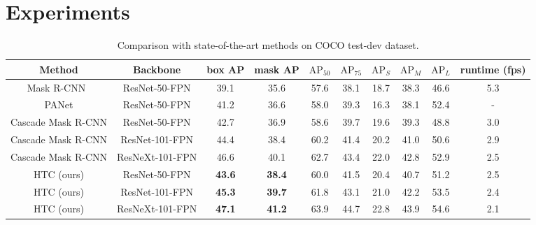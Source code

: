 \documentclass[10pt,twocolumn,letterpaper]{article}
\begin{document}
\section{Experiments}
\label{sec:experiments}

\begin{table*}[htb]
	\centering
	\caption{Comparison with state-of-the-art methods on COCO test-dev dataset.}
	\vspace{0.1cm}
	\addtolength{\tabcolsep}{-1pt}
	\begin{tabular}{*{10}{c}}
		\toprule
		Method                       & Backbone        & box AP & mask AP & $\text{AP}_{50}$ & $\text{AP}_{75}$ & $\text{AP}_{S}$ & $\text{AP}_{M}$ & $\text{AP}_{L}$ & runtime (fps) \\
		\midrule
		Mask R-CNN~\cite{he2017mask} & ResNet-50-FPN   & 39.1   & 35.6    & 57.6             & 38.1             & 18.7            & 38.3            & 46.6            & 5.3           \\
		PANet\cite{liu2018path}      & ResNet-50-FPN   & 41.2   & 36.6    & 58.0             & 39.3             & 16.3            & 38.1            & 52.4            & -             \\
		\midrule
		Cascade Mask R-CNN           & ResNet-50-FPN   & 42.7   & 36.9    & 58.6             & 39.7             & 19.6            & 39.3            & 48.8            & 3.0           \\
		Cascade Mask R-CNN           & ResNet-101-FPN  & 44.4   & 38.4    & 60.2             & 41.4             & 20.2            & 41.0            & 50.6            & 2.9           \\
		Cascade Mask R-CNN           & ResNeXt-101-FPN & 46.6   & 40.1    & 62.7             & 43.4             & 22.0            & 42.8            & 52.9            & 2.5           \\
		\midrule
		HTC (ours)                   & ResNet-50-FPN   & \textbf{43.6}   & \textbf{38.4}    & 60.0             & 41.5             & 20.4            & 40.7            & 51.2            & 2.5           \\
		HTC (ours)                   & ResNet-101-FPN  & \textbf{45.3}   & \textbf{39.7}    & 61.8             & 43.1             & 21.0            & 42.2            & 53.5            & 2.4           \\
		HTC (ours)                   & ResNeXt-101-FPN & \textbf{47.1}   & \textbf{41.2}    & 63.9             & 44.7             & 22.8            & 43.9            & 54.6            & 2.1           \\
		\bottomrule
	\end{tabular}
	\label{tab:overall-results}
\end{table*}
\end{document}
